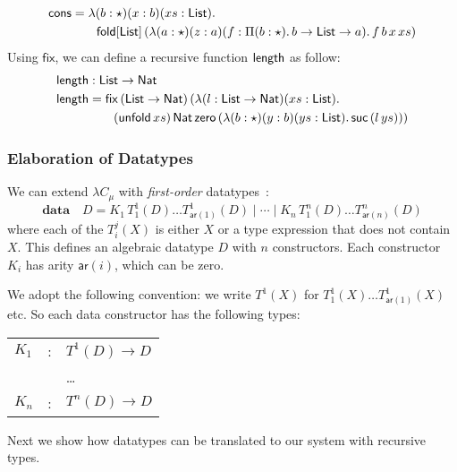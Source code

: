 \begin{itemize}
\begin{align*}
  \cons &= \lambda(b : \star)(x : b)(xs : \List).\\
       &\qquad \fold{\List}{(\lambda(a : \star)(z : a)(f : \Pi (b : \star).\,b\rightarrow \List \rightarrow a).\,f\,b\,x\,xs)}
\end{align*}
Using $\mathsf{fix}$, we can define a recursive function $\length$ as
follow:
\begin{align*}
  \length &: \List \rightarrow \Nat\\
  \length &= \mathsf{fix}\,(\List \rightarrow \Nat)\,(\lambda(l : \List
            \rightarrow \Nat)(xs : \List).\\
          &\qquad (\unfold[\List]{xs})\,\Nat\,\zero\,(\lambda(b : \star)(y : b)(ys : \List).\,\suc\,(l\,ys)))
\end{align*}
\end{itemize}

\subsubsection{Elaboration of Datatypes}

We can extend $\lambda C_{\mu}$ with \emph{first-order}
datatypes~\cite{geuvers2014church}:
\[
  \mathbf{data} \quad D = K_{1}\,T_{1}^{1}(D) \dots
  T_{\mathsf{ar}(1)}^{1}(D) \mid \cdots \mid K_{n}\,T_{1}^{n}(D) \dots
  T_{\mathsf{ar}(n)}^{n}(D)
\]
where each of the $T_{i}^{j}(X)$ is either $X$ or a type expression
that does not contain $X$. This defines an algebraic datatype $D$ with
$n$ constructors. Each constructor $K_{i}$ has arity $\mathsf{ar}(i)$,
which can be zero.

We adopt the following convention: we write $T^{1}(X)$ for
$T_{1}^{1}(X) \dots T_{\mathsf{ar}(1)}^{1}(X)$ etc. So each data
constructor has the following types:
\begingroup
\renewcommand*{\arraystretch}{1.0}
\begin{table}[h]
  \centering
  \begin{tabular}{lll}
    $K_{1}$ &:& $T^{1}(D) \rightarrow D$ \\
            && \dots \\
    $K_{n}$ &:& $T^{n}(D) \rightarrow D$
  \end{tabular}
\end{table}
\endgroup

Next we show how datatypes can be translated to our system with
recursive types.

